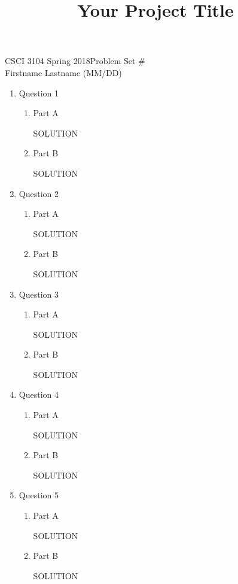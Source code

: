 \documentclass[12pt]{article}
\title{Your Project Title}
\begin{document}
CSCI 3104 Spring 2018\hfill Problem Set \#\\
Firstname Lastname (MM/DD)

\hrulefill

\begin{enumerate}
\item Question 1
  \begin{enumerate}
  \item Part A

  SOLUTION

  \item Part B

  SOLUTION
  \end{enumerate}
\newpage

\item Question 2
  \begin{enumerate}
  \item Part A

  SOLUTION

  \item Part B

  SOLUTION
  \end{enumerate}
\newpage

\item Question 3
  \begin{enumerate}
  \item Part A

  SOLUTION

  \item Part B

  SOLUTION
  \end{enumerate}
\newpage

\item Question 4
  \begin{enumerate}
  \item Part A

  SOLUTION

  \item Part B

  SOLUTION
  \end{enumerate}
\newpage

\item Question 5
  \begin{enumerate}
  \item Part A

  SOLUTION

  \item Part B

  SOLUTION
  \end{enumerate}
\newpage

\end{enumerate}
\end{document}
